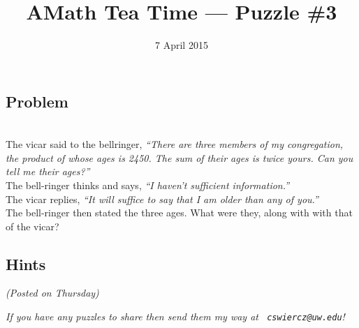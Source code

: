 \documentclass[12pt]{article}
\title{AMath Tea Time --- Puzzle \#3}
\author{}
\date{\vspace{-1cm}7 April 2015}
\begin{document}
\maketitle
{}

\subsection*{Problem}

 \\

\noindent The vicar said to the bellringer, {\it ``There are three members of
  my congregation, the product of whose ages is 2450. The sum of their ages is
  twice yours. Can you tell me their ages?''} \\

\noindent The bell-ringer thinks and says, {\it ``I haven't sufficient
  information.''} \\

\noindent The vicar replies, {\it ``It will suffice to say that I am older than
  any of you.''} \\

\noindent The bell-ringer then stated the three ages. What were they, along
with with that of the vicar? \\

\subsection*{Hints}

{\it (Posted on Thursday)}


{
\par\vspace*{\fill}
\noindent \small \it
If you have any puzzles to share then send them my way at {\tt
  cswiercz@uw.edu}!
}
\end{document}

